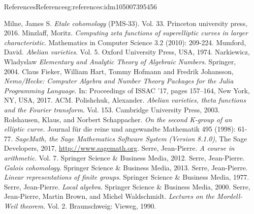 \documentclass[oneside,10pt,]{book}
\numberwithin{equation}{section}
\begin{document}
\begin{references-chapter-numberless}{References}{}{References}{}{}{g:references:idm105007395456}
\begin{thebibliography}{9}
\hypertarget{x:biblio:bib-milne-etale}{}Milne, James S. \textit{Etale cohomology} (PMS-33). Vol. 33. Princeton university press, 2016.
\hypertarget{x:biblio:bib-minzlaff}{}Minzlaff, Moritz. \textit{Computing zeta functions of superelliptic curves in larger characteristic}. Mathematics in Computer Science 3.2 (2010): 209-224.
\hypertarget{x:biblio:bib-mumford-abvar}{}Mumford, David. \textit{Abelian varieties}. Vol. 5. Oxford University Press, USA, 1974.
\hypertarget{x:biblio:bib-narkiewicz}{}Narkiewicz, Wladyslaw  \textit{Elementary and Analytic Theory of Algebraic Numbers}. Springer, 2004.
\hypertarget{x:biblio:bib-nemo}{}Claus Fieker, William Hart, Tommy Hofmann and Fredrik Johansson, \textit{Nemo\slash{}Hecke: Computer Algebra and Number Theory Packages for the Julia Programming Language}. In: Proceedings of ISSAC '17, pages 157–164, New York, NY, USA, 2017. ACM.
\hypertarget{x:biblio:bib-polishchuck}{}Polishchuk, Alexander. \textit{Abelian varieties, theta functions and the Fourier transform}. Vol. 153. Cambridge University Press, 2003.
\hypertarget{x:biblio:bib-rolshausen}{}Rolshausen, Klaus, and Norbert Schappacher.  \textit{On the second K-group of an elliptic curve.}  Journal für die reine und angewandte Mathematik 495 (1998): 61-77.
\hypertarget{x:biblio:bib-sage}{}\textit{SageMath, the Sage Mathematics Software System (Version 8.1.0)}, The Sage Developers, 2017, \url{http://www.sagemath.org}.
\hypertarget{x:biblio:bib-serre-course}{}Serre, Jean-Pierre. \textit{A course in arithmetic}. Vol. 7. Springer Science \& Business Media, 2012.
\hypertarget{x:biblio:bib-serre-gal-coh}{}Serre, Jean-Pierre. \textit{Galois cohomology}. Springer Science \& Business Media, 2013.
\hypertarget{x:biblio:bib-serre-linear-reps}{}Serre, Jean-Pierre. \textit{Linear representations of finite groups}. Springer Science \& Business Media, 1977.
\hypertarget{x:biblio:bib-serre-local-alg}{}Serre, Jean-Pierre. \textit{Local algebra}. Springer Science \& Business Media, 2000.
\hypertarget{x:biblio:bib-serre-mordell-weil}{}Serre, Jean-Pierre, Martin Brown, and Michel Waldschmidt. \textit{Lectures on the Mordell-Weil theorem}. Vol. 2. Braunschweig: Vieweg, 1990.

\end{thebibliography}
\end{references-chapter-numberless}
\end{document}
